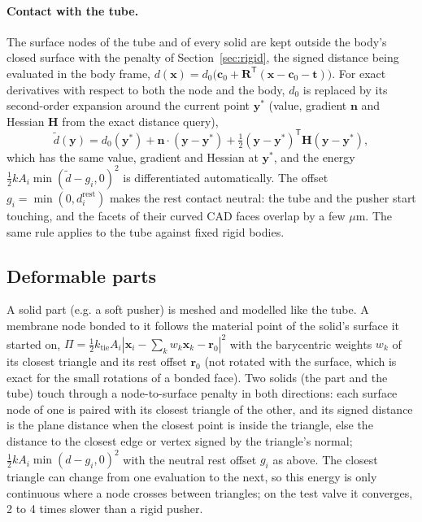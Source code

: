 \documentclass[11pt,a4paper]{article}
\theoremstyle{remark}
\begin{document}
\paragraph{Contact with the tube.} The surface nodes of the tube and of every solid are kept outside
the body's closed surface with the penalty of Section~\ref{sec:rigid}, the signed distance being evaluated in the
body frame, $d(\bm x) = d_0\bigl(\bm c_0 + \bm R^{\mathsf T}(\bm x - \bm c_0 - \bm t)\bigr)$. For
exact derivatives with respect to both the node and the body, $d_0$ is replaced by its
second-order expansion around the current point $\bm y^\ast$ (value, gradient $\bm n$ and Hessian
$\bm H$ from the exact distance query),
\begin{equation}
  \tilde d(\bm y) = d_0(\bm y^\ast) + \bm n\cdot(\bm y - \bm y^\ast)
                 + \tfrac12(\bm y - \bm y^\ast)^{\mathsf T}\bm H(\bm y - \bm y^\ast),
\end{equation}
which has the same value, gradient and Hessian at $\bm y^\ast$, and the energy
$\tfrac12 k A_i \min(\tilde d - g_i, 0)^2$ is differentiated automatically. The offset
$g_i = \min(0, d_i^\mathrm{rest})$ makes the rest contact neutral: the tube and the pusher start
touching, and the facets of their curved CAD faces overlap by a few $\mu$m. The same rule applies to
the tube against fixed rigid bodies.

\subsection{Deformable parts}
A solid part (e.g. a soft pusher) is meshed and modelled like the tube. A membrane node bonded to it
follows the material point of the solid's surface it started on,
$\Pi = \tfrac12 k_\mathrm{tie} A_i |\bm x_i - \sum_k w_k \bm x_k - \bm r_0|^2$ with the barycentric
weights $w_k$ of its closest triangle and its rest offset $\bm r_0$ (not rotated with the surface,
which is exact for the small rotations of a bonded face). Two solids (the part and the tube) touch
through a node-to-surface penalty in both directions: each surface node of one is paired with its
closest triangle of the other, and its signed distance is the plane distance when the closest point
is inside the triangle, else the distance to the closest edge or vertex signed by the triangle's
normal; $\tfrac12 k A_i \min(d - g_i, 0)^2$ with the neutral rest offset $g_i$ as above. The closest
triangle can change from one evaluation to the next, so this energy is only continuous where a
node crosses between triangles; on the test valve it converges, 2 to 4 times slower than a rigid
pusher.
\end{document}
